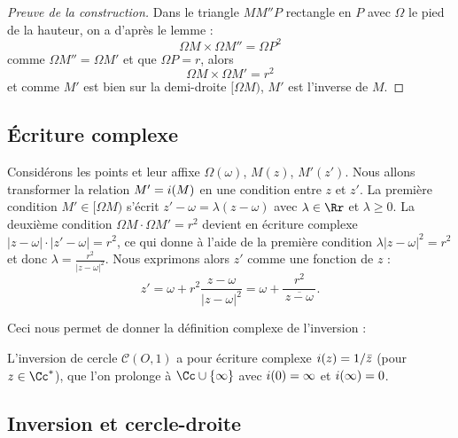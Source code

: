 \documentclass[11pt,class=report,crop=false]{standalone}
\begin{document}
\begin{proof}[Preuve de la construction]
Dans le triangle $M M'' P$ rectangle en $P$ avec $\Omega$ le pied de la hauteur, on a d'après le lemme :
$$\Omega M \times \Omega M'' = \Omega P^2$$
comme $\Omega M'' = \Omega M'$ et que $\Omega P = r$, alors
$$\Omega M \times \Omega M' = r^2$$
et comme $M'$ est bien sur la demi-droite $[\Omega M)$, $M'$ est  l'inverse de $M$.
\end{proof}




\subsection{\'Ecriture complexe}

Considérons les points et leur affixe $\Omega(\omega)$, $M(z)$, $M'(z')$.
Nous allons transformer la relation $M'= i (M)$ en une condition entre $z$ et $z'$.
La première condition $M' \in [\Omega M)$ s'écrit $z'-\omega= \lambda(z-\omega)$ avec $\lambda \in \Rr$ 
et $\lambda \ge 0$.
La deuxième condition $\Omega M \cdot \Omega M' = r^2$ devient en écriture complexe 
$|z-\omega|\cdot|z'-\omega| = r^2$, ce qui donne à l'aide de la première condition
$\lambda |z-\omega|^2 = r^2$ et donc $\lambda = \frac{r^2}{|z-\omega|^2}$.
Nous exprimons alors $z'$ comme une fonction de $z$ :
$$z'= \omega + r^2 \frac{z-\omega}{|z-\omega|^2} = \omega + \frac{r^2}{\,\overline{z-\omega}\,}.$$

Ceci nous permet de donner la définition complexe de l'inversion :

\begin{exemple}
L'inversion de cercle $\mathcal{C}(O,1)$ a pour écriture complexe $i(z)=1/ \bar z$ (pour $z\in \Cc^*$),
que l'on prolonge à $\Cc \cup \{\infty\}$ avec $i(0) = \infty$ et $i(\infty)=0$.
\end{exemple}


\subsection{Inversion et cercle-droite}
\end{document}
